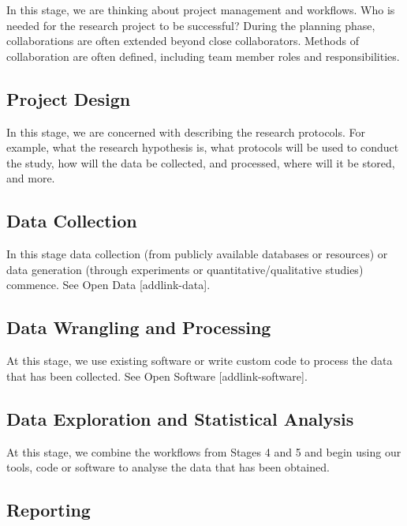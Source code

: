 \documentclass[
  letterpaper,
  DIV=11,
  numbers=noendperiod]{scrreport}
\begin{document}
In this stage, we are thinking about project management and workflows.
Who is needed for the research project to be successful? During the
planning phase, collaborations are often extended beyond close
collaborators. Methods of collaboration are often defined, including
team member roles and responsibilities.

\hypertarget{project-design}{%
\subsection{Project Design}\label{project-design}}

In this stage, we are concerned with describing the research protocols.
For example, what the research hypothesis is, what protocols will be
used to conduct the study, how will the data be collected, and
processed, where will it be stored, and more.

\hypertarget{data-collection}{%
\subsection{Data Collection}\label{data-collection}}

In this stage data collection (from publicly available databases or
resources) or data generation (through experiments or
quantitative/qualitative studies) commence. See Open Data
{[}addlink-data{]}.

\hypertarget{data-wrangling-and-processing}{%
\subsection{Data Wrangling and
Processing}\label{data-wrangling-and-processing}}

At this stage, we use existing software or write custom code to process
the data that has been collected. See Open Software
{[}addlink-software{]}.

\hypertarget{data-exploration-and-statistical-analysis}{%
\subsection{Data Exploration and Statistical
Analysis}\label{data-exploration-and-statistical-analysis}}

At this stage, we combine the workflows from Stages 4 and 5 and begin
using our tools, code or software to analyse the data that has been
obtained.

\hypertarget{reporting}{%
\subsection{Reporting}\label{reporting}}
\end{document}
